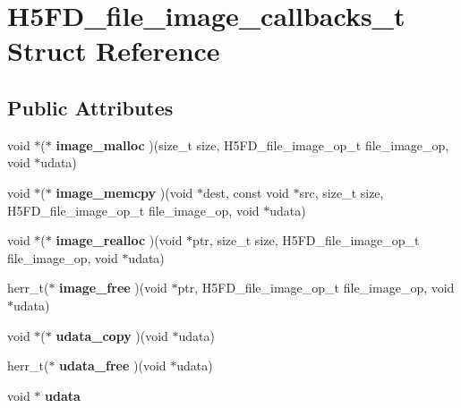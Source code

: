 \hypertarget{struct_h5_f_d__file__image__callbacks__t}{}\section{H5\+F\+D\+\_\+file\+\_\+image\+\_\+callbacks\+\_\+t Struct Reference}
\label{struct_h5_f_d__file__image__callbacks__t}
\subsection*{Public Attributes}
\begin{DoxyCompactItemize}
\item 
\mbox{\label{struct_h5_f_d__file__image__callbacks__t_ab2c1434d7c57b42a4f6f2d8ad2036de9}} 
void $\ast$($\ast$ {\bfseries image\+\_\+malloc} )(size\+\_\+t size, H5\+F\+D\+\_\+file\+\_\+image\+\_\+op\+\_\+t file\+\_\+image\+\_\+op, void $\ast$udata)
\item 
\mbox{\label{struct_h5_f_d__file__image__callbacks__t_a660e5e8ae3665acabd8c643128f82784}} 
void $\ast$($\ast$ {\bfseries image\+\_\+memcpy} )(void $\ast$dest, const void $\ast$src, size\+\_\+t size, H5\+F\+D\+\_\+file\+\_\+image\+\_\+op\+\_\+t file\+\_\+image\+\_\+op, void $\ast$udata)
\item 
\mbox{\label{struct_h5_f_d__file__image__callbacks__t_af7d3c305dfec67007e8159c07dc9c496}} 
void $\ast$($\ast$ {\bfseries image\+\_\+realloc} )(void $\ast$ptr, size\+\_\+t size, H5\+F\+D\+\_\+file\+\_\+image\+\_\+op\+\_\+t file\+\_\+image\+\_\+op, void $\ast$udata)
\item 
\mbox{\label{struct_h5_f_d__file__image__callbacks__t_a6843c283378ac975ecf3703ac75a2768}} 
herr\+\_\+t($\ast$ {\bfseries image\+\_\+free} )(void $\ast$ptr, H5\+F\+D\+\_\+file\+\_\+image\+\_\+op\+\_\+t file\+\_\+image\+\_\+op, void $\ast$udata)
\item 
\mbox{\label{struct_h5_f_d__file__image__callbacks__t_a0dd86f65f4de8add9eac7af65e8d49fe}} 
void $\ast$($\ast$ {\bfseries udata\+\_\+copy} )(void $\ast$udata)
\item 
\mbox{\label{struct_h5_f_d__file__image__callbacks__t_a979fdef6ca1a84c6125c37a1fd59b7ad}} 
herr\+\_\+t($\ast$ {\bfseries udata\+\_\+free} )(void $\ast$udata)
\item 
\mbox{\label{struct_h5_f_d__file__image__callbacks__t_abb39d2bcc97be9569663f87e1b1974e6}} 
void $\ast$ {\bfseries udata}
\end{DoxyCompactItemize}


